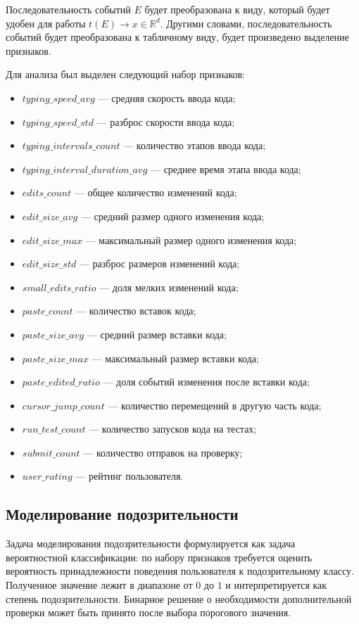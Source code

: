 Последовательность событий $E$ будет преобразована к виду, который будет удобен для работы $t(E) \to x \in \mathbb{R}^d$.
Другими словами, последовательность событий будет преобразована к табличному виду, будет произведено выделение признаков.

Для анализа был выделен следующий набор признаков:
\begin{itemize}
\item $typing\_speed\_avg$ --- средняя скорость ввода кода;
\item $typing\_speed\_std$ --- разброс скорости ввода кода;
\item $typing\_intervals\_count$ --- количество этапов ввода кода;
\item $typing\_interval\_duration\_avg$ --- среднее время этапа ввода кода;
\item $edits\_count$ --- общее количество изменений кода;
\item $edit\_size\_avg$ --- средний размер одного изменения кода;
\item $edit\_size\_max$ --- максимальный размер одного изменения кода;
\item $edit\_size\_std$ --- разброс размеров изменений кода;
\item $small\_edits\_ratio$ --- доля мелких изменений кода;
\item $paste\_count$ --- количество вставок кода;
\item $paste\_size\_avg$ --- средний размер вставки кода;
\item $paste\_size\_max$ --- максимальный размер вставки кода;
\item $paste\_edited\_ratio$ --- доля событий изменения после вставки кода;
\item $cursor\_jump\_count$ --- количество перемещений в другую часть кода;
\item $run\_test\_count$ --- количество запусков кода на тестах;
\item $submit\_count$ --- количество отправок на проверку;
\item $user\_rating$ --- рейтинг пользователя.
\end{itemize}

\subsection{Моделирование подозрительности}

Задача моделирования подозрительности формулируется как задача вероятностной классификации:
по набору признаков требуется оценить вероятность принадлежности поведения пользователя к подозрительному классу.
Полученное значение лежит в диапазоне от $0$ до $1$ и интерпретируется как степень подозрительности.
Бинарное решение о необходимости дополнительной проверки может быть принято после выбора порогового значения.

